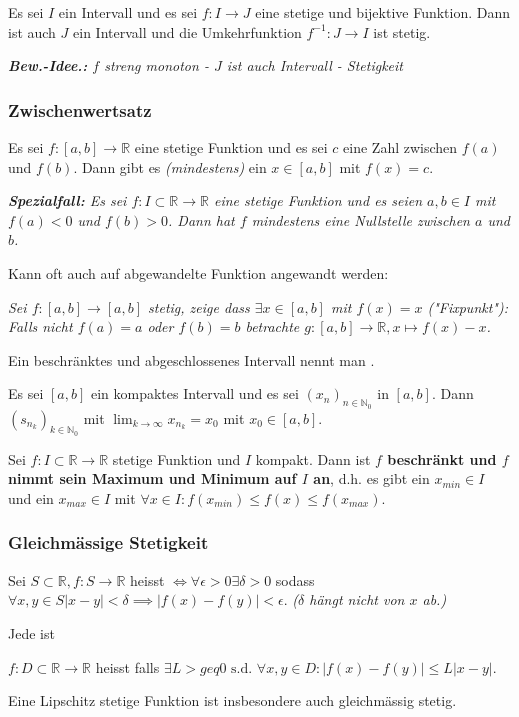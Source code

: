  Es sei $I$ ein Intervall und es sei $f:I \rightarrow J$ eine stetige und bijektive Funktion. Dann ist auch $J$ ein Intervall und die Umkehrfunktion $f^{-1}:J \rightarrow I$ ist stetig.

\textit{\textbf{Bew.-Idee.:} $f$ streng monoton - $J$ ist auch Intervall - Stetigkeit}

\subsubsection{Zwischenwertsatz}
 Es sei $f: [a,b] \rightarrow \mathbb{R}$ eine stetige Funktion und es sei $c$ eine Zahl zwischen $f(a)$ und $f(b)$. Dann gibt es \textit{(mindestens)} ein $x \in [a,b]$ mit $f(x)=c$.

\textit{\textbf{Spezialfall:}  Es sei $f: I \subset \mathbb{R} \rightarrow \mathbb{R}$ eine stetige Funktion und es seien $a,b \in I$ mit $f(a) < 0$ und $f(b)>0$. Dann hat $f$ mindestens eine Nullstelle zwischen $a$ und $b$.}

\begin{exercise}
Kann oft auch auf abgewandelte Funktion angewandt werden:

\textit{
Sei $f: [a,b] \rightarrow [a,b]$ stetig, zeige dass $\exists x \in [a,b]$ mit $f(x)=x$ ("Fixpunkt"): Falls nicht $f(a)=a$ oder $f(b)=b$ betrachte $g: [a,b] \rightarrow \mathbb{R}, x \mapsto f(x) - x$.
}
\end{exercise}

Ein beschränktes und abgeschlossenes Intervall nennt man .

Es sei $[a,b]$ ein kompaktes Intervall und es sei $(x_n)_{n\in \mathbb{N}_0}$ in $[a,b]$. Dann  $(s_{n_k})_{k \in \mathbb{N}_0}$ mit $\lim_{k \rightarrow\infty} x_{n_k} = x_0$ mit $x_0 \in [a,b]$.

 Sei $f: I \subset \mathbb{R} \rightarrow \mathbb{R}$ stetige Funktion und $I$ kompakt. Dann ist \textbf{$f$ beschränkt und $f$ nimmt sein Maximum und Minimum auf $I$ an}, d.h. es gibt ein $x_{min} \in I$ und ein $x_{max} \in I$ mit $\forall x \in I : f(x_{min}) \leq f(x) \leq f(x_{max})$.

{\color{gray}
\subsubsection{Gleichmässige Stetigkeit}
Sei $S \subset \mathbb{R}, f:S \rightarrow \mathbb{R}$ heisst  $\iff \forall \epsilon>0 \exists \delta > 0$ sodass $\forall x,y \in S |x-y|<\delta \implies |f(x)-f(y)|<\epsilon$. \textit{($\delta$ hängt nicht von $x$ ab.)}

Jede  ist 

$f:D\subset \mathbb{R} \to \mathbb{R}$ heisst  falls $\exists L >geq 0\text{ s.d. }\forall x,y \in D:|f(x)-f(y)| \leq L|x-y|$. 

Eine Lipschitz stetige Funktion ist insbesondere auch gleichmässig stetig.
}

